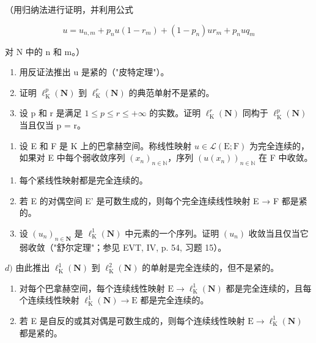 （用归纳法进行证明，并利用公式

\[
u = u _ {n, m} + p _ {n} u (1 - r _ {m}) + (1 - p _ {n}) u r _ {m} + p _ {n} u q _ {m}
\]

对 N 中的 n 和 m。）

\begin{enumerate}
\def\labelenumi{\alph{enumi})}
\setcounter{enumi}{2}
\item
  用反证法推出 u 是紧的（"皮特定理"）。
\item
  证明 \(\ell_{\mathrm{K}}^{p}(\mathbf{N})\) 到 \(\ell_{\mathrm{K}}^{r}(\mathbf{N})\) 的典范单射不是紧的。
\item
  设 p 和 r 是满足 \(1 \leqslant p \leqslant r \leqslant +\infty\) 的实数。证明 \(\ell_{\mathrm{K}}^{r}(\mathbf{N})\) 同构于 \(\ell_{\mathrm{K}}^{p}(\mathbf{N})\) 当且仅当 p = r。
\end{enumerate}

\begin{enumerate}
\def\labelenumi{\arabic{enumi})}
\setcounter{enumi}{10}
\tightlist
\item
  设 E 和 F 是 K 上的巴拿赫空间。称线性映射 \(u \in \mathcal{L}(\mathrm{E};\mathrm{F})\) 为完全连续的，如果对 E 中每个弱收敛序列 \((x_{n})_{n \in \mathbb{N}}\)，序列 \((u(x_{n}))_{n \in \mathbb{N}}\) 在 F 中收敛。
\end{enumerate}

\begin{enumerate}
\def\labelenumi{\alph{enumi})}
\item
  每个紧线性映射都是完全连续的。
\item
  若 E 的对偶空间 E' 是可数生成的，则每个完全连续线性映射 E → F 都是紧的。
\item
  设 \((u_{n})_{n\in\mathbf{N}}\) 是 \(\ell_{\mathrm{K}}^{1}(\mathbf{N})\) 中元素的一个序列。证明 \((u_{n})\) 收敛当且仅当它弱收敛（"舒尔定理"；参见 EVT, IV, p. 54, 习题 15）。
\end{enumerate}

\(d)\) 由此推出 \(\ell_{\mathrm{K}}^{1}(\mathbf{N})\) 到 \(\ell_{\mathrm{K}}^{2}(\mathbf{N})\) 的单射是完全连续的，但不是紧的。

\begin{enumerate}
\def\labelenumi{\alph{enumi})}
\setcounter{enumi}{4}
\item
  对每个巴拿赫空间，每个连续线性映射 \(\mathrm{E} \to \ell_{\mathrm{K}}^{1}(\mathbf{N})\) 都是完全连续的，且每个连续线性映射 \(\ell_{\mathrm{K}}^{1}(\mathbf{N}) \to \mathrm{E}\) 都是完全连续的。
\item
  若 E 是自反的或其对偶是可数生成的，则每个连续线性映射 \(\mathrm{E} \rightarrow \ell_{\mathrm{K}}^{1}(\mathbf{N})\) 都是紧的。
\end{enumerate}

